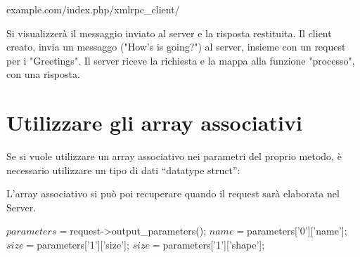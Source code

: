 \begin{code}
example.com/index.php/xmlrpc_client/
\end{code}

Si visualizzerà il messaggio inviato al server e la risposta restituita. Il client creato, invia un messaggo ("How's is going?") al server, insieme con un request per i "Greetings". Il server riceve la richiesta e la mappa alla funzione "processo", con una risposta.

\section*{Utilizzare gli array associativi}

Se si vuole utilizzare un array associativo nei parametri del proprio metodo, è necessario utilizzare un tipo di dati ``datatype struct'':


L'array associativo si può poi recuperare quando il request sarà elaborata nel Server.

\begin{code}
$parameters = $request->output_parameters();
$name = $parameters['0']['name'];
$size = $parameters['1']['size'];
$size = $parameters['1']['shape'];
\end{code}

